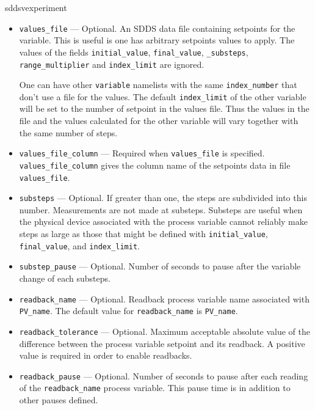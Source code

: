 \begin{sddsprog}{sddsvexperiment}
\begin{itemize}
\begin{itemize}
    \item {\verb+values_file+} --- Optional. An SDDS data file
      containing setpoints for the variable.  This is useful is one
      has arbitrary setpoints values to apply.  The values of the
      fields {\verb+initial_value+}, {\verb+final_value+},
      {\verb+_substeps+}, {\verb+range_multiplier+} and
      {\verb+index_limit+} are ignored.

      One can have other \verb+variable+ namelists with the same
      \verb+index_number+ that don't use a file for the values.  The
      default {\verb+index_limit+} of the other variable will be set
      to the number of setpoint in the values file.  Thus the values
      in the file and the values calculated for the other variable
      will vary together with the same number of steps.

    \item {\verb+values_file_column+} --- Required when
      {\verb+values_file+} is specified.  {\verb+values_file_column+}
      gives the column name of the setpoints data in file
      {\verb+values_file+}.

    \item {\verb+substeps+} --- Optional. If greater than one, the
      steps are subdivided into this number.  Measurements are not
      made at substeps. Substeps are useful when the physical device
      associated with the process variable cannot reliably make steps
      as large as those that might be defined with
      {\verb+initial_value+}, {\verb+final_value+}, and
      {\verb+index_limit+}.

    \item {\verb+substep_pause+} --- Optional. Number of seconds to
      pause after the variable change of each substeps.

    \item {\verb+readback_name+} --- Optional. Readback process
      variable name associated with {\verb+PV_name+}. The default
      value for {\verb+readback_name+} is {\verb+PV_name+}.

    \item {\verb+readback_tolerance+} --- Optional. Maximum acceptable
      absolute value of the difference between the process variable
      setpoint and its readback. A positive value is required in order
      to enable readbacks.

    \item {\verb+readback_pause+} --- Optional. Number of seconds to
      pause after each reading of the {\verb+readback_name+} process
      variable.  This pause time is in addition to other pauses
      defined.


\end{itemize}
\end{itemize}
\end{sddsprog}
